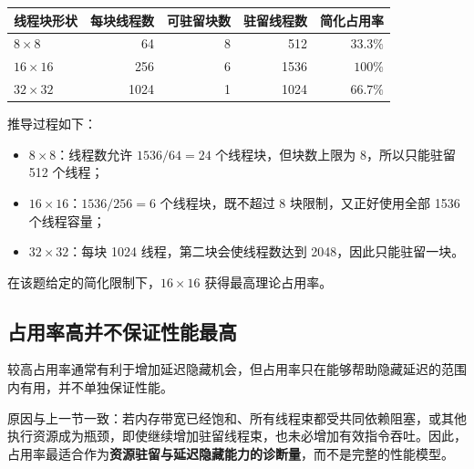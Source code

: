 \begin{center}
\begin{tabular}{lrrrr}
\toprule
线程块形状 & 每块线程数 & 可驻留块数 & 驻留线程数 & 简化占用率 \\
\midrule
\(8\times8\) & 64 & 8 & 512 & \(33.3\%\) \\
\(16\times16\) & 256 & 6 & 1536 & \(100\%\) \\
\(32\times32\) & 1024 & 1 & 1024 & \(66.7\%\) \\
\bottomrule
\end{tabular}
\end{center}

推导过程如下：

\begin{itemize}
  \item \(8\times8\)：线程数允许 \(1536/64=24\) 个线程块，但块数上限为 8，所以只能驻留 512 个线程；
  \item \(16\times16\)：\(1536/256=6\) 个线程块，既不超过 8 块限制，又正好使用全部 1536 个线程容量；
  \item \(32\times32\)：每块 1024 线程，第二块会使线程数达到 2048，因此只能驻留一块。
\end{itemize}

在该题给定的简化限制下，\(16\times16\) 获得最高理论占用率。

\subsection{占用率高并不保证性能最高}

较高占用率通常有利于增加延迟隐藏机会，但占用率只在能够帮助隐藏延迟的范围内有用，并不单独保证性能。

原因与上一节一致：若内存带宽已经饱和、所有线程束都受共同依赖阻塞，或其他执行资源成为瓶颈，即使继续增加驻留线程束，也未必增加有效指令吞吐。因此，占用率最适合作为\textbf{资源驻留与延迟隐藏能力的诊断量}，而不是完整的性能模型。
